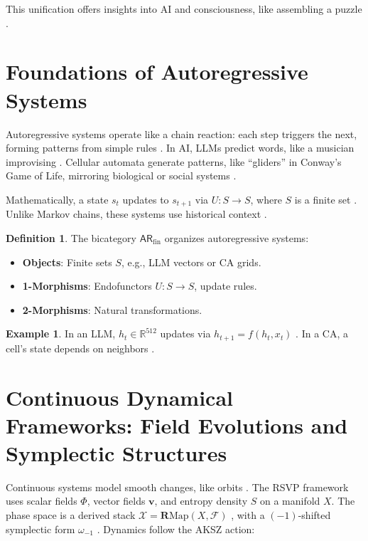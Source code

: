 \documentclass[a4paper,12pt]{article}
\theoremstyle{definition}
\newtheorem{definition}{Definition}[section]
\newtheorem{example}{Example}[section]
\newcommand{\ARfin}{\mathsf{AR}_{\mathrm{fin}}}
\newcommand{\X}{\mathcal{X}}
\begin{document}
This unification offers insights into AI and consciousness, like assembling a puzzle \cite{Ghahramani2015, Lake2017, Tenenbaum2011, Griffiths2010}.

\section{Foundations of Autoregressive Systems}
\label{sec:autoregressive}

Autoregressive systems operate like a chain reaction: each step triggers the next, forming patterns from simple rules \cite{Yule1927, Neumann1966}. In AI, LLMs predict words, like a musician improvising \cite{Vaswani2017, Schmidhuber2015, Goodfellow2016, LeCun2015}. Cellular automata generate patterns, like “gliders” in Conway’s Game of Life, mirroring biological or social systems \cite{Wolfram2002, Conway1970, Gardner1970}.

Mathematically, a state \( s_t \) updates to \( s_{t+1} \) via \( U: S \to S \), where \( S \) is a finite set \cite{Rumelhart1986, Hinton2006, Bengio2009}. Unlike Markov chains, these systems use historical context \cite{Baars1988, Edelman2004}.

\begin{definition}
\label{def:arfin}
The bicategory \(\ARfin\) organizes autoregressive systems:
\begin{itemize}
    \item \textbf{Objects}: Finite sets \( S \), e.g., LLM vectors or CA grids.
    \item \textbf{1-Morphisms}: Endofunctors \( U: S \to S \), update rules.
    \item \textbf{2-Morphisms}: Natural transformations.
\end{itemize}
\end{definition}

\begin{example}
In an LLM, \( h_t \in \mathbb{R}^{512} \) updates via \( h_{t+1} = f(h_t, x_t) \) \cite{Vaswani2017}. In a CA, a cell’s state depends on neighbors \cite{Conway1970}.
\end{example}

\section{Continuous Dynamical Frameworks: Field Evolutions and Symplectic Structures}
\label{sec:continuous}

Continuous systems model smooth changes, like orbits \cite{Newton1687, Lagrange1788, Hamilton1834}. The RSVP framework uses scalar fields \(\Phi\), vector fields \(\mathbf{v}\), and entropy density \( S \) on a manifold \( X \). The phase space is a derived stack \(\X = \mathbf{R}\mathrm{Map}(X, \mathcal{F})\) \cite{Lurie2009}, with a \((-1)\)-shifted symplectic form \(\omega_{-1}\) \cite{PTVV2013}. Dynamics follow the AKSZ action:
\end{document}
